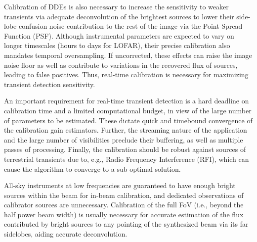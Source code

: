 \documentclass{aa}
\begin{document}
Calibration  of DDEs is  also necessary  to increase  the sensitivity  to weaker
transients via  adequate deconvolution of  the brightest sources to  lower their
side-lobe confusion  noise contribution to the  rest of the image  via the Point
Spread Function (PSF).  Although instrumental parameters are expected to vary on
longer  timescales (hours  to days  for LOFAR),  their precise  calibration also
mandates  temporal oversampling.  If uncorrected,  these effects  can  raise the
image noise floor  as well as contribute to variations in  the recovered flux of
sources, leading  to false positives.  Thus, real-time  calibration is necessary
for maximizing transient detection sensitivity.

An important requirement for real-time transient detection is a hard deadline on
calibration time and a limited computational budget, in view of the large number
of parameters to be estimated.  These dictate quick and timebound convergence of
the  calibration  gain  estimators.    Further,  the  streaming  nature  of  the
application and  the large number  of visibilities preclude their  buffering, as
well as multiple passes of processing. Finally, the calibration should be robust
against  sources  of  terrestrial  transients  due  to,  e.g.,  Radio  Frequency
Interference (RFI), which  can cause the algorithm to  converge to a sub-optimal
solution.

All-sky  instruments at  low frequencies  are guaranteed  to have  enough bright
sources within the  beam for in-beam calibration, and  dedicated observations of
calibrator sources  are unnecessary. Calibration  of the full FoV  (i.e., beyond
the half power  beam width) is usually necessary for  accurate estimation of the
flux contributed by  bright sources to any pointing of  the synthesized beam via
its  far sidelobes,  aiding accurate  deconvolution. 

\end{document}

